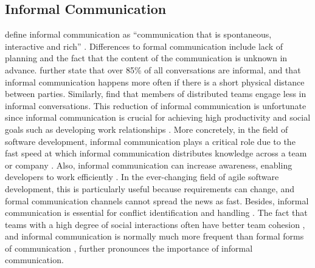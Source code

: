 

\subsection{Informal Communication}
\citeauthor{kraut1990informal} define informal communication as \enquote{communication that is spontaneous, interactive and rich} \autocite[p.~5]{kraut1990informal}. Differences to formal communication include lack of planning and the fact that the content of the communication is unknown in advance. \textcite{kraut1990informal} further state that over 85\% of all conversations are informal, and that informal communication happens more often if there is a short physical distance between parties. Similarly, \textcite{hinds2005understanding} find that members of distributed teams engage less in informal conversations. This reduction of informal communication is unfortunate since informal communication is crucial for achieving high productivity and social goals \autocite{kraut1990informal} such as developing work relationships \autocite{comella2020revisiting, olson2006bridging}. More concretely, in the field of software development, informal communication plays a critical role due to the fast speed at which informal communication distributes knowledge across a team or company \autocite{french1998study, mockus2001challenges}. Also, informal communication can increase awareness, enabling developers to work efficiently \autocite{herbsleb2001global}. In the ever-changing field of agile software development, this is particularly useful because requirements can change, and formal communication channels cannot spread the news as fast. Besides, informal communication is essential for conflict identification and handling \autocite{hinds2005understanding}. The fact that teams with a high degree of social interactions often have better team cohesion \autocite{staehle2014management}, and informal communication is normally much more frequent than formal forms of communication \autocite{kraut1990informal}, further pronounces the importance of informal communication.

